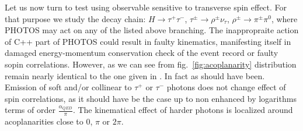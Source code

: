 \documentclass[]{Photos_interface_design}
\begin{document}
Let us now turn to test using observable sensitive to transverse spin effect.
 For that purpose we study the decay chain:
$H\to \tau^+\tau^-$, $\tau^\pm \to \rho^\pm \nu_\tau$, 
$\rho^\pm \to \pi^\pm \pi^0$, where PHOTOS may act on any of the listed above branching. The inappropraite action of C++ part of PHOTOS could result in faulty
kinematics, manifesting itself in damaged energy-momentum conservation check of the event record or faulty sopin correlations. However, as we can see from 
fig.~\ref{fig:acoplanarity} distribution remain nearly identical to the 
one given in \cite{tauolaC++}. In fact as should have been. Emission of soft
and/or collinear to $\tau^+$ or $\tau^-$ photons does not change effect of 
spin correlations, as it should have be the case up to non enhanced by logarithms terms of order $\frac{\alpha_{QED}}{\pi}$. The kinematical effect of harder 
photons is localized around acoplanarities close to $0$, $\pi$ or $2\pi$. 
\end{document}
